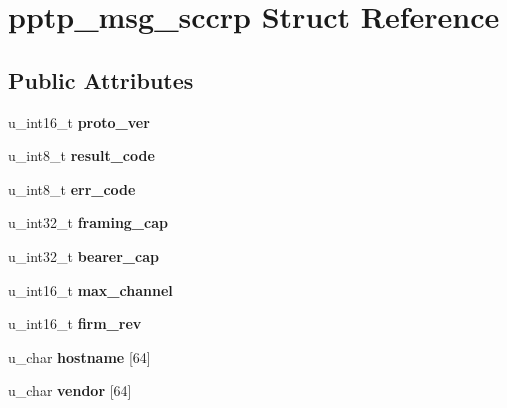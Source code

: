 \hypertarget{structpptp__msg__sccrp}{
\section{pptp\_\-msg\_\-sccrp Struct Reference}
\label{structpptp__msg__sccrp}
}
\subsection*{Public Attributes}
\begin{DoxyCompactItemize}
\item 
\hypertarget{structpptp__msg__sccrp_ab5ded33a9123bc989612f5c27f50c141}{
u\_\-int16\_\-t {\bfseries proto\_\-ver}}
\label{structpptp__msg__sccrp_ab5ded33a9123bc989612f5c27f50c141}

\item 
\hypertarget{structpptp__msg__sccrp_a0892cc03d716884819ebecbb0d202f95}{
u\_\-int8\_\-t {\bfseries result\_\-code}}
\label{structpptp__msg__sccrp_a0892cc03d716884819ebecbb0d202f95}

\item 
\hypertarget{structpptp__msg__sccrp_a074bcd8dca968ccfd8730d85c8e118e1}{
u\_\-int8\_\-t {\bfseries err\_\-code}}
\label{structpptp__msg__sccrp_a074bcd8dca968ccfd8730d85c8e118e1}

\item 
\hypertarget{structpptp__msg__sccrp_a11d9ac695ec318ea5cd72b3f7f0e9d50}{
u\_\-int32\_\-t {\bfseries framing\_\-cap}}
\label{structpptp__msg__sccrp_a11d9ac695ec318ea5cd72b3f7f0e9d50}

\item 
\hypertarget{structpptp__msg__sccrp_ae2ae8c812a3b3bc3a92026a57363d09e}{
u\_\-int32\_\-t {\bfseries bearer\_\-cap}}
\label{structpptp__msg__sccrp_ae2ae8c812a3b3bc3a92026a57363d09e}

\item 
\hypertarget{structpptp__msg__sccrp_aa9321762a14fd7615c3e994b511e14d7}{
u\_\-int16\_\-t {\bfseries max\_\-channel}}
\label{structpptp__msg__sccrp_aa9321762a14fd7615c3e994b511e14d7}

\item 
\hypertarget{structpptp__msg__sccrp_af92b517b7d68ad1b19095a9027c25212}{
u\_\-int16\_\-t {\bfseries firm\_\-rev}}
\label{structpptp__msg__sccrp_af92b517b7d68ad1b19095a9027c25212}

\item 
\hypertarget{structpptp__msg__sccrp_afbcccc423f1d86893775ff21d9db1b85}{
u\_\-char {\bfseries hostname} \mbox{[}64\mbox{]}}
\label{structpptp__msg__sccrp_afbcccc423f1d86893775ff21d9db1b85}

\item 
\hypertarget{structpptp__msg__sccrp_ae4a702b998601bcb1e90321dad42b7d1}{
u\_\-char {\bfseries vendor} \mbox{[}64\mbox{]}}
\label{structpptp__msg__sccrp_ae4a702b998601bcb1e90321dad42b7d1}

\end{DoxyCompactItemize}


